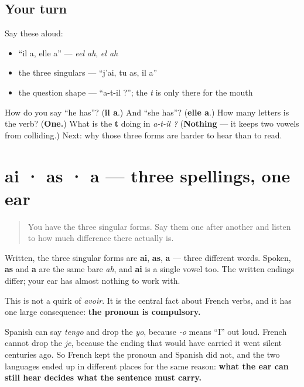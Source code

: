 \subsection*{Your turn}
Say these aloud:

\begin{itemize}
\raggedright
  \item \textquotedblleft{}il a, elle a\textquotedblright{} — \emph{eel ah}, \emph{el ah}
  \item the three singulars — \textquotedblleft{}j'ai, tu as, il a\textquotedblright{}
  \item the question shape — \textquotedblleft{}a-t-il ?\textquotedblright{}; the \emph{t} is only there for the mouth
\end{itemize}

\begin{tcolorbox}[breakable,colback=teal!4,colframe=teal!35!black,title={Before you move on}]
How do you say \textquotedblleft{}he has\textquotedblright{}? (\textbf{il a}.) And \textquotedblleft{}she has\textquotedblright{}? (\textbf{elle a}.) How many letters is the verb? (\textbf{One.}) What is the \textbf{t} doing in \emph{a-t-il ?} (\textbf{Nothing} — it keeps two vowels from colliding.) Next: why those three forms are harder to hear than to read.
\end{tcolorbox}
\section[ai · as · a]{ai · as · a — three spellings, one ear}

\label{lesson:FR-C14-ai-as-a}



\begin{quote}
You have the three singular forms. Say them one after another and listen to how much difference there actually is.
\end{quote}

\begin{grammarlens}[title={Grammar Lens: the endings are for the eye}]
Written, the three singular forms are \textbf{ai}, \textbf{as}, \textbf{a} — three different words. Spoken, \textbf{as} and \textbf{a} are the same bare \emph{ah}, and \textbf{ai} is a single vowel too. The written endings differ; your ear has almost nothing to work with.

This is not a quirk of \emph{avoir}. It is the central fact about French verbs, and it has one large consequence: \textbf{the pronoun is compulsory.}

Spanish can say \emph{tengo} and drop the \emph{yo}, because \emph{-o} means \textquotedblleft{}I\textquotedblright{} out loud. French cannot drop the \emph{je}, because the ending that would have carried it went silent centuries ago. So French kept the pronoun and Spanish did not, and the two languages ended up in different places for the same reason: \textbf{what the ear can still hear decides what the sentence must carry.}
\end{grammarlens}

